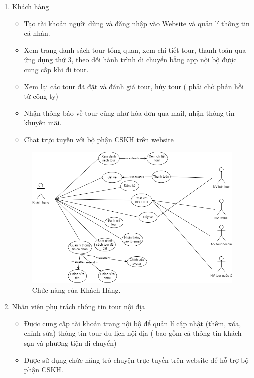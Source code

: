 \begin{enumerate}
\item Khách hàng


\begin{itemize}
\item Tạo tài khoản người dùng và đăng nhập vào Website và quản lí thông tin cá nhân.
\item Xem trang danh sách tour tổng quan, xem chi tiết tour, thanh toán qua ứng dụng thứ 3, theo dỗi hành trình di chuyển bằng app nội bộ được cung cấp khi đi tour.
\item Xem lại các tour đã đặt và đánh giá tour, hủy tour ( phải chờ phản hồi từ công ty)
\item Nhận thông báo về tour cũng như hóa đơn qua mail, nhận thông tin khuyến mãi.
\item Chat trực tuyến với bộ phận CSKH trên website
\end{itemize}

\begin{figure}[ht]
    \centering
    \includegraphics[width = 1.15\linewidth]{figures/Sub-UseCase-KhachHang.png}
    \caption{Chức năng của Khách Hàng.}
    \label{fig:example_1}
\end{figure}

\vspace{5cm}

\item Nhân viên phụ trách thông tin tour nội địa

\begin{itemize}
\item Được cung cấp tài khoản trang nội bộ để quản lí cập nhật (thêm, xóa, chỉnh sửa) thông tin tour du lịch nội địa ( bao gồm cả thông tin khách sạn và phương tiện di chuyển)
\item Được sử dụng chức năng trò chuyện trực tuyến trên website để hỗ trợ bộ phận CSKH.
\end{itemize}


\end{enumerate}
